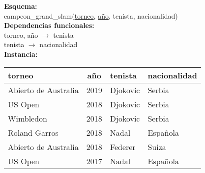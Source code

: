\documentclass[preview]{standalone}
\begin{document}
\textbf{Esquema:}\\
campeon\_grand\_slam(\underline{torneo}, \underline{a\~no}, tenista, nacionalidad)\\

\textbf{Dependencias funcionales:}\\
torneo, a\~no $\rightarrow$ tenista\\
tenista $\rightarrow$ nacionalidad\\

\textbf{Instancia:}
\begin{center}
\begin{tabular}{| l | c | l | l |}\hline			
	torneo & a\~no & tenista & nacionalidad  \\\hline			
	Abierto de Australia & 2019 & Djokovic & Serbia \\
	US Open & 2018 & Djokovic & Serbia \\
	Wimbledon & 2018 & Djokovic & Serbia \\
	Roland Garros & 2018 & Nadal & Espa\~nola \\
	Abierto de Australia & 2018 & Federer & Suiza \\
	US Open & 2017 & Nadal & Espa\~nola \\\hline
\end{tabular}
\end{center}
\end{document}
